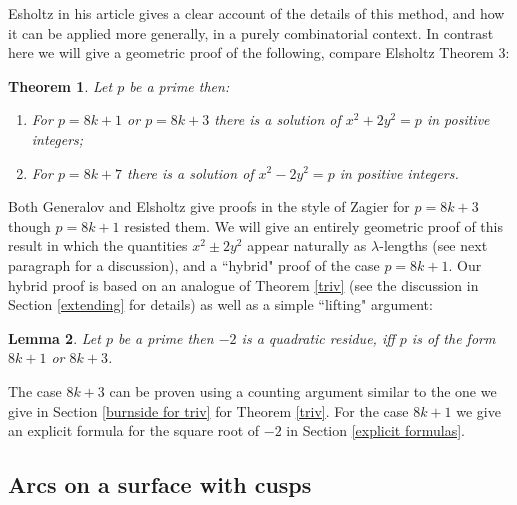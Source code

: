 \documentclass[12pt,a4paper]{amsart}
\newtheorem{thm}{Theorem}[section]
\newtheorem{lem}[thm]{Lemma}
\begin{document}
Esholtz in his article gives a clear account of the details of this
method, and how it can be applied more generally, in a purely
combinatorial context.
In contrast here we will give a geometric proof of the following, compare Elsholtz \cite{elsholtz} Theorem 3:


\begin{thm}\label{case m equals 2}
Let $p$ be a prime then: 
\begin{enumerate}
	\item For $p =8k+1$  or $p=8k+3$ there is a solution of 
$x^2 + 2y^2 = p $
in positive integers;
	\item For $p = 8k +7$ there is a solution of $x^2 - 2y^2 = p $
in positive integers.
\end{enumerate}
\end{thm}

\noindent
Both Generalov \cite{generalov} and  Elsholtz give proofs in the
style of Zagier for $p = 8k + 3 $ 
though $p=8k+ 1$ resisted them.
We will give an entirely geometric proof of this result
in which the quantities 
$x^2 \pm 2y^2  $ appear naturally as $\lambda$-lengths
(see next paragraph for a discussion),
and a
``hybrid" proof of the  case $p=8k+1$.
Our hybrid proof is based on an analogue of Theorem \ref{triv} (see
the discussion in Section \ref{extending} for details)
as well as a simple ``lifting" argument:

\begin{lem}\label{analogue for -2}
Let $p$ be a prime then 
$-2$ is a quadratic residue, 
iff  $p$ is of the form $8k+1$ or $8k+3$.
\end{lem}

The case $8k+3$ can be proven using 
a counting argument similar to the one we give in Section
\ref{burnside for triv}
for Theorem \ref{triv}.
For the case $8k+1$ we give an explicit formula
for the square root of $-2$ in Section \ref{explicit formulas}.




\subsection{Arcs on a surface with cusps}
\end{document}
